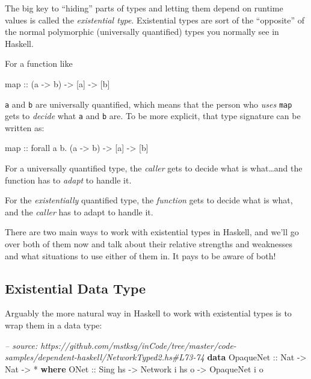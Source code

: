 \documentclass[]{article}
\newenvironment{Shaded}{}{}
\newcommand{\KeywordTok}[1]{\textcolor[rgb]{0.00,0.44,0.13}{\textbf{{#1}}}}
\newcommand{\DataTypeTok}[1]{\textcolor[rgb]{0.56,0.13,0.00}{{#1}}}
\newcommand{\CommentTok}[1]{\textcolor[rgb]{0.38,0.63,0.69}{\textit{{#1}}}}
\newcommand{\OtherTok}[1]{\textcolor[rgb]{0.00,0.44,0.13}{{#1}}}
\newcommand{\FunctionTok}[1]{\textcolor[rgb]{0.02,0.16,0.49}{{#1}}}
\newcommand{\NormalTok}[1]{{#1}}
\begin{document}
The big key to ``hiding'' parts of types and letting them depend on runtime
values is called the \emph{existential type}. Existential types are sort of the
``opposite'' of the normal polymorphic (universally quantified) types you
normally see in Haskell.

For a function like

\begin{Shaded}
\begin{Highlighting}[]
\NormalTok{map}\OtherTok{ ::} \NormalTok{(a }\OtherTok{->} \NormalTok{b) }\OtherTok{->} \NormalTok{[a] }\OtherTok{->} \NormalTok{[b]}
\end{Highlighting}
\end{Shaded}

\texttt{a} and \texttt{b} are universally quantified, which means that the
person who \emph{uses} \texttt{map} gets to \emph{decide} what \texttt{a} and
\texttt{b} are. To be more explicit, that type signature can be written as:

\begin{Shaded}
\begin{Highlighting}[]
\NormalTok{map}\OtherTok{ ::} \NormalTok{forall a b}\FunctionTok{.} \NormalTok{(a }\OtherTok{->} \NormalTok{b) }\OtherTok{->} \NormalTok{[a] }\OtherTok{->} \NormalTok{[b]}
\end{Highlighting}
\end{Shaded}

For a universally quantified type, the \emph{caller} gets to decide what is
what\ldots{}and the function has to \emph{adapt} to handle it.

For the \emph{existentially} quantified type, the \emph{function} gets to decide
what is what, and the \emph{caller} has to adapt to handle it.

There are two main ways to work with existential types in Haskell, and we'll go
over both of them now and talk about their relative strengths and weaknesses and
what situations to use either of them in. It pays to be aware of both!

\subsection{Existential Data Type}\label{existential-data-type}

Arguably the more natural way in Haskell to work with existential types is to
wrap them in a data type:

\begin{Shaded}
\begin{Highlighting}[]
\CommentTok{-- source: https://github.com/mstksg/inCode/tree/master/code-samples/dependent-haskell/NetworkTyped2.hs#L73-74}
\KeywordTok{data} \DataTypeTok{OpaqueNet}\OtherTok{ ::} \DataTypeTok{Nat} \OtherTok{->} \DataTypeTok{Nat} \OtherTok{->} \FunctionTok{*} \KeywordTok{where}
    \DataTypeTok{ONet}\OtherTok{ ::} \DataTypeTok{Sing} \NormalTok{hs }\OtherTok{->} \DataTypeTok{Network} \NormalTok{i hs o }\OtherTok{->} \DataTypeTok{OpaqueNet} \NormalTok{i o}
\end{Highlighting}
\end{Shaded}
\end{document}
